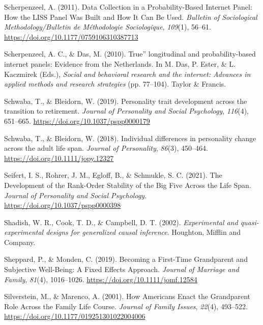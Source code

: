 \documentclass[
  english,
  man, noextraspace]{apa7}
\begin{document}
\leavevmode\hypertarget{ref-scherpenzeelDataCollectionProbabilityBased2011}{}%
Scherpenzeel, A. (2011). Data Collection in a Probability-Based Internet Panel: How the LISS Panel Was Built and How It Can Be Used. \emph{Bulletin of Sociological Methodology/Bulletin de Méthodologie Sociologique}, \emph{109}(1), 56--61. \url{https://doi.org/10.1177/0759106310387713}

\leavevmode\hypertarget{ref-scherpenzeelTrueLongitudinalProbabilitybased2010}{}%
Scherpenzeel, A. C., \& Das, M. (2010). True'' longitudinal and probability-based internet panels: Evidence from the Netherlands. In M. Das, P. Ester, \& L. Kaczmirek (Eds.), \emph{Social and behavioral research and the internet: Advances in applied methods and research strategies} (pp. 77--104). Taylor \& Francis.

\leavevmode\hypertarget{ref-schwabaPersonalityTraitDevelopment2019}{}%
Schwaba, T., \& Bleidorn, W. (2019). Personality trait development across the transition to retirement. \emph{Journal of Personality and Social Psychology}, \emph{116}(4), 651--665. \url{https://doi.org/10.1037/pspp0000179}

\leavevmode\hypertarget{ref-schwabaIndividualDifferencesPersonality2018}{}%
Schwaba, T., \& Bleidorn, W. (2018). Individual differences in personality change across the adult life span. \emph{Journal of Personality}, \emph{86}(3), 450--464. \url{https://doi.org/10.1111/jopy.12327}

\leavevmode\hypertarget{ref-seifertDevelopmentRankOrderStability2021}{}%
Seifert, I. S., Rohrer, J. M., Egloff, B., \& Schmukle, S. C. (2021). The Development of the Rank-Order Stability of the Big Five Across the Life Span. \emph{Journal of Personality and Social Psychology}. \url{https://doi.org/10.1037/pspp0000398}

\leavevmode\hypertarget{ref-shadishExperimentalQuasiexperimentalDesigns2002}{}%
Shadish, W. R., Cook, T. D., \& Campbell, D. T. (2002). \emph{Experimental and quasi-experimental designs for generalized causal inference}. Houghton, Mifflin and Company.

\leavevmode\hypertarget{ref-sheppardBecomingFirstTimeGrandparent2019}{}%
Sheppard, P., \& Monden, C. (2019). Becoming a First-Time Grandparent and Subjective Well-Being: A Fixed Effects Approach. \emph{Journal of Marriage and Family}, \emph{81}(4), 1016--1026. \url{https://doi.org/10.1111/jomf.12584}

\leavevmode\hypertarget{ref-silversteinHowAmericansEnact2001}{}%
Silverstein, M., \& Marenco, A. (2001). How Americans Enact the Grandparent Role Across the Family Life Course. \emph{Journal of Family Issues}, \emph{22}(4), 493--522. \url{https://doi.org/10.1177/019251301022004006}
\end{document}
